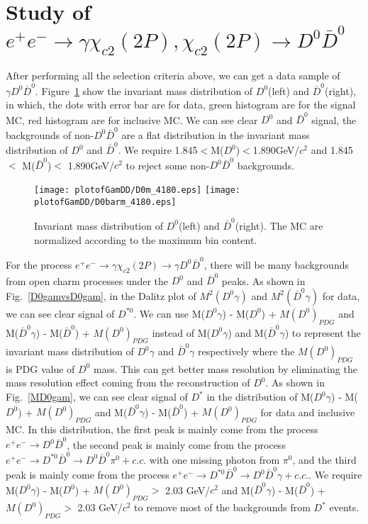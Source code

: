 \documentclass[aps,preprint,tightenlines,superscriptaddress,showpacs,byrevtex,amsmath,amssymb,nofloatfix]{revtex4}
\begin{document}
\section{Study of $e^{+}e^{-}\rightarrow \gamma \chi_{c2}(2P), \chi_{c2}(2P)\rightarrow D^{0}\bar{D}^{0}$}

   After performing all the selection criteria above, we can get a data sample of $\gamma D^{0}\bar{D}^{0}$. Figure~\ref{mD0andmD0bar} show the invariant mass distribution of $D^{0}$(left) and $\bar{D}^{0}$(right), in which, the dots with error bar are for data, green histogram are for the signal MC, red histogram are for inclusive MC. We can see clear $D^{0}$ and $\bar{D}^{0}$ signal, the backgrounds of non-$D^{0}\bar{D}^{0}$ are a flat distribution in the invariant mass distribution of $D^{0}$ and $\bar{D}^{0}$. We require 1.845$ <$M($D^{0}$)$<$1.890GeV/$c^{2}$ and 1.845 $<$ M($\bar{D}^{0}$)$<$ 1.890GeV/$c^{2}$ to reject some non-$D^{0}\bar{D}^{0}$ backgrounds.

\begin{figure}[!htbp]
\captionsetup{justification=raggedright}
    \texttt{[image: plotofGamDD/D0m\_4180.eps]}
    \texttt{[image: plotofGamDD/D0barm\_4180.eps]}
  \caption{\small Invariant mass distribution of $D^{0}$(left) and $\bar{D}^{0}$(right). The MC are normalized according to the maximum bin content.}
  \label{mD0andmD0bar}
 \end{figure}

For the process $e^{+}e^{-}\rightarrow \gamma \chi_{c2} (2P)\rightarrow \gamma D^{0}\bar{D}^{0}$, there will be many backgrounds from open charm processes under the  $D^{0}$ and $\bar{D}^{0}$ peaks. As shown in Fig.~\ref{D0gamvsD0gam}, in the Dalitz plot of $M^{2}(D^{0}\gamma)$ and  $M^{2}(\bar{D}^{0}\gamma)$  for data, we can see clear signal of $D^{*0}$. We can use M($D^{0}\gamma$) - M($D^{0}$) + $M(D^{0})_{PDG}$ and M($\bar{D}^{0}\gamma$) - M($\bar{D}^{0}$) + $M(D^{0})_{PDG}$ instead of M($D^{0}\gamma$) and M($\bar{D}^{0}\gamma$) to represent the invariant mass distribution of $D^{0}\gamma$ and $\bar{D}^{0}\gamma$ respectively where the $M(D^{0})_{PDG}$ is PDG value of $D^{0}$ mass. This can get better mass resolution by eliminating the mass resolution effect coming from the reconstruction of $D^{0}$. As shown in Fig.~\ref{MD0gam}, we can see clear signal of $D^{*}$ in the distribution of M($D^{0}\gamma$) - M($D^{0}$) + $M(D^{0})_{PDG}$ and M($\bar{D}^{0}\gamma$) - M($\bar{D}^{0}$) + $M(D^{0})_{PDG}$ for data and inclusive MC. In this distribution, the first peak is mainly come from the process $e^{+}e^{-} \rightarrow D^{0}\bar{D}^{0}$, the second peak is mainly come from the process $e^{+}e^{-} \rightarrow D^{*0}\bar{D}^{0} \rightarrow D^{0}\bar{D}^{0}\pi^{0} + c.c.$ with one missing photon from $\pi^{0}$, and the third peak is mainly come from the process $e^{+}e^{-} \rightarrow D^{*0}\bar{D}^{0} \rightarrow D^{0}\bar{D}^{0}\gamma + c.c. $.   We require M($D^{0}\gamma$) - M($D^{0}$) + $M(D^{0})_{PDG} >$ 2.03 GeV/$c^{2}$  and M($\bar{D}^{0}\gamma$) - M($\bar{D}^{0}$) + $M(D^{0})_{PDG} >$ 2.03 GeV/$c^{2}$ to remove most of the backgrounds from $D^{*}$ events.
\end{document}

